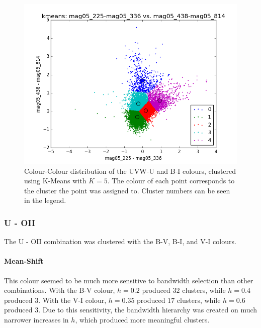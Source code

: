 \begin{figure}[H]
\centering
\includegraphics[width=\linewidth]{figs/kmeans_xy_5cl_mag05_225-mag05_336vsmag05_438-mag05_814}
\caption{Colour-Colour distribution of the UVW-U and B-I colours, clustered using K-Means with $K=5$. The colour of each point corresponds to the cluster the point was assigned to. Cluster numbers can be seen in the legend.}
\label{fig:UVWKM2}
\end{figure}

\subsubsection{U - OII}
The U - OII combination was clustered with the B-V, B-I, and V-I colours. %

\paragraph{Mean-Shift}
This colour seemed to be much more sensitive to bandwidth selection than other combinations.
With the B-V colour, $h=0.2$ produced $32$ clusters, while $h=0.4$ produced $3$. With the V-I colour, $h=0.35$ produced $17$ clusters, while $h=0.6$ produced $3$.
Due to this sensitivity, the bandwidth hierarchy was created on much narrower increases in $h$, which produced more meaningful clusters. 












